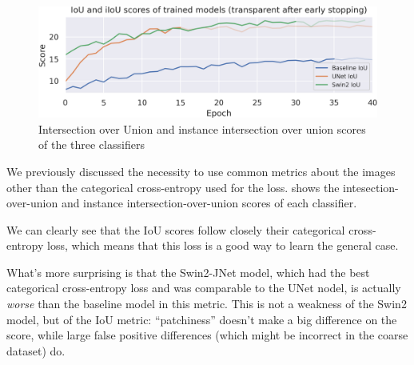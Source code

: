 \begin{figure}[h]
	\centering
	\includegraphics[width=.9\textwidth]{iou_scores.png}
	\caption{Intersection over Union and instance intersection over union scores of the three classifiers}
	\label{comparisons}
\end{figure}

We previously discussed the necessity to use common metrics about the images other than the categorical cross-entropy used for the loss.
 shows the intesection-over-union and instance intersection-over-union scores of each classifier.


We can clearly see that the IoU scores follow closely their categorical cross-entropy loss, which means that this loss is a good way to learn the general case.

What's more surprising is that the Swin2-JNet model, which had the best categorical cross-entropy loss and was comparable to the UNet nodel, is actually \emph{worse} than the baseline model in this metric.
This is not a weakness of the Swin2 model, but of the IoU metric: ``patchiness'' doesn't make a big difference on the score, while large false positive differences (which might be incorrect in the coarse dataset) do.


